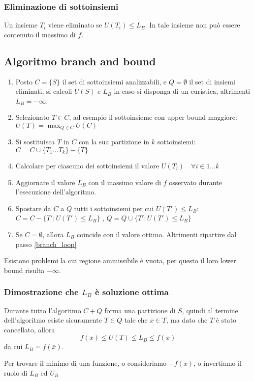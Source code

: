 \documentclass[../template]{subfiles}
\begin{document}
\subsubsection{Eliminazione di sottoinsiemi}
Un insieme $T_i$ viene eliminato se $U(T_i) \le L_B$. In tale insieme non può essere contenuto il massimo di $f$.
\subsection{Algoritmo branch and bound}
\begin{enumerate}
    \item
        Posto $C = \{S\}$ il set di sottoinsiemi analizzabili, e $Q = \emptyset$ il set di insiemi eliminati,
        si calcoli $U(S)$ e $L_B$ in caso si disponga di un euristica, altrimenti $L_B=-\infty$.

    \item\label{branch_loop}
        Selezionato $T \in C$, ad esempio il sottoinsieme con upper bound maggiore: $U(T) = \max_{Q \in C} U(C)$
    \item
        Si sostituisca $T$ in $C$ con la sua partizione in $k$ sottoinsiemi:
        $C = C \cup \{T_1 \dots T_k\} - \{T\}$
    \item
        Calcolare per ciascuno dei sottoinsiemi il valore $U(T_i) \quad \forall i \in 1\dots k$
    \item
        Aggiornare il valore $L_B$ con il massimo valore di $f$ osservato durante l'esecuzione dell'algoritmo.
    \item
        Spostare da $C$ a $Q$ tutti i sottoinsiemi per cui $U(T') \le L_B$:
        $C = C - \{T': U(T') \le L_B\}$ , $Q = Q \cup \{T': U(T') \le L_B\}$
    \item Se $C = \emptyset$, allora $L_B$ coincide con il valore ottimo. Altrimenti ripartire dal passo
        \ref{branch_loop}
\end{enumerate}
Esistono problemi la cui regione ammissibile è vuota, per questo il loro lower bound risulta $-\infty$.
\subsubsection{Dimostrazione che $L_B$ è soluzione ottima}
Durante tutto l'algoritmo $C + Q$ forma una partizione di $S$, quindi al termine dell'algoritmo esiste sicuramente $T
\in Q$ tale che $\bar{x} \in T$, ma dato che $T$ è stato cancellato, allora
\[
    f(\bar{x}) \le U(T) \le L_B \le f(\bar{x})
\]
da cui $L_B = f(\bar{x})$.

Per trovare il minimo di una funzione, o consideriamo $-f(x)$, o invertiamo il ruolo di $L_B$ ed $U_B$

\end{document}
